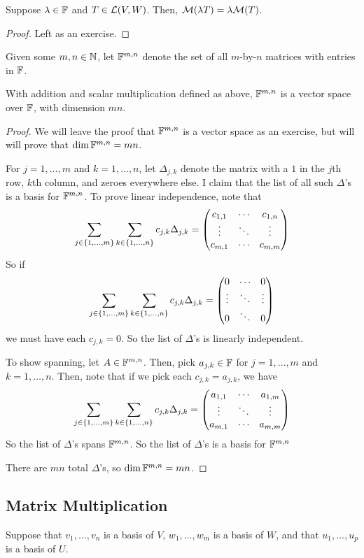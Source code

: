 \begin{theorem}
    Suppose $\lambda\in\F$ and $T\in\lmap(V,W)$. Then, $\matr(\lambda T) = \lambda\matr(T)$.
\end{theorem}
\begin{proof}
    Left as an exercise.
\end{proof}
\begin{definition}[$\F^{m,n}$]
    Given some $m,n\in\N$, let $\F^{m,n}$ denote the set of all $m$-by-$n$ matrices with entries in $\F$.
\end{definition}
\begin{theorem}
    With addition and scalar multiplication defined as above, $\F^{m,n}$ is a vector space over $\F$, with dimension $mn$.
\end{theorem}
\begin{proof}
    We will leave the proof that $\F^{m,n}$ is a vector space as an exercise, but will will prove that $\dim \F^{m,n} = mn$.

    For $j = 1, \dots, m$ and $k = 1, \dots, n$, let $\Delta_{j,k}$ denote the matrix with a $1$ in the $j$th row, $k$th column, and zeroes everywhere else. I claim that the list of all such $\Delta$'s is a basis for $\F^{m,n}$. To prove linear independence, note that
    \begin{align*}
        \sum_{j\in \{1, \dots, m\}}\sum_{k\in \{1, \dots, n\}}c_{j,k}\Delta_{j,k} = \amat{c}{m}{n}
    \end{align*}
    So if 
    \[ \sum_{j\in \{1, \dots, m\}}\sum_{k\in \{1, \dots, n\}}c_{j,k}\Delta_{j,k} = \fmat{0}\]
    we must have each $c_{j,k} = 0$. So the list of $\Delta$'s is linearly independent.

    To show spanning, let $A\in \F^{m,n}$. Then, pick $a_{j,k}\in \F$ for $j=1,\dots, m$ and $k = 1,\dots, n$. Then, note that if we pick each $c_{j,k} = a_{j,k}$, we have
    \[ \sum_{j\in \{1, \dots, m\}}\sum_{k\in \{1, \dots, n\}}c_{j,k}\Delta_{j,k} = \amat{a}{m}{m}\]
    So the list of $\Delta$'s spans $\F^{m,n}$. So the list of $\Delta$'s is a basis for $\F^{m,n}$ 

    There are $mn$ total $\Delta$'s, so $\dim\F^{m,n} = mn$.
\end{proof}
\subsection*{Matrix Multiplication}
Suppose that $v_1, \dots, v_n$ is a basis of $V$, $w_1, \dots, w_m$ is a basis of $W$, and that $u_1, \dots, u_p$ is a basis of $U$.

